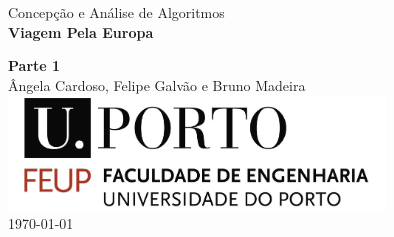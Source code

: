 

\begin{titlepage}
\begin{center}
 
\vspace*{3cm}

{\Large Concepção e Análise de Algoritmos}\\[2cm]

{\Huge \bfseries Viagem Pela Europa \\[1cm]}

{\bfseries Parte 1} \\[2cm]

{\large Ângela Cardoso, Felipe Galvão e Bruno Madeira}\\[2cm]

\includegraphics[width=10cm]{feup_logo.jpg}\\[2cm]


{\large \today}

\end{center}
\end{titlepage}